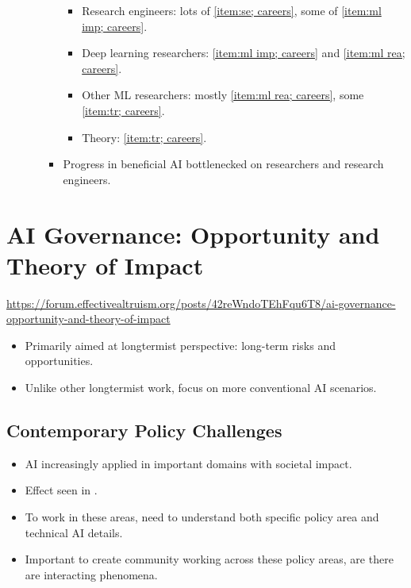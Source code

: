 \begin{itemize}
\begin{itemize}
\begin{itemize}
            \begin{itemize}
                \item Research engineers: lots of \ref{item:se; careers}, some of \ref{item:ml imp; careers}.
                \item Deep learning researchers: \ref{item:ml imp; careers} and \ref{item:ml rea; careers}.
                \item Other ML researchers: mostly \ref{item:ml rea; careers}, some \ref{item:tr; careers}.
                \item Theory: \ref{item:tr; careers}.
            \end{itemize}
            \item Progress in beneficial AI bottlenecked on researchers and research engineers.
        \end{itemize}
    \end{itemize}
\end{itemize}


\section{AI Governance: Opportunity and Theory of Impact}

\url{https://forum.effectivealtruism.org/posts/42reWndoTEhFqu6T8/ai-governance-opportunity-and-theory-of-impact}

\begin{itemize}
    \item Primarily aimed at longtermist perspective: long-term risks and opportunities.
    \item Unlike other longtermist work, focus on more conventional AI scenarios.
\end{itemize}


\subsection{Contemporary Policy Challenges}

\begin{itemize}
    \item AI increasingly applied in important domains with societal impact.
    \item Effect seen in .
    \item To work in these areas, need to understand both specific policy area and technical AI details.
    \item Important to create community working across these policy areas, are there are interacting phenomena.
\end{itemize}


